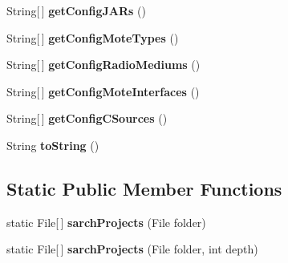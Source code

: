 \begin{DoxyCompactItemize}
\item 
\hypertarget{classorg_1_1contikios_1_1cooja_1_1COOJAProject_a94302bfa54c5c311ee8c6df2b28f17a2}{String\mbox{[}$\,$\mbox{]} {\bfseries get\-Config\-J\-A\-Rs} ()}\label{classorg_1_1contikios_1_1cooja_1_1COOJAProject_a94302bfa54c5c311ee8c6df2b28f17a2}

\item 
\hypertarget{classorg_1_1contikios_1_1cooja_1_1COOJAProject_aa8527b7be4d2b7480f3da0a647083188}{String\mbox{[}$\,$\mbox{]} {\bfseries get\-Config\-Mote\-Types} ()}\label{classorg_1_1contikios_1_1cooja_1_1COOJAProject_aa8527b7be4d2b7480f3da0a647083188}

\item 
\hypertarget{classorg_1_1contikios_1_1cooja_1_1COOJAProject_a6ba392a4710d172b48f57dad9754e19f}{String\mbox{[}$\,$\mbox{]} {\bfseries get\-Config\-Radio\-Mediums} ()}\label{classorg_1_1contikios_1_1cooja_1_1COOJAProject_a6ba392a4710d172b48f57dad9754e19f}

\item 
\hypertarget{classorg_1_1contikios_1_1cooja_1_1COOJAProject_a9956332e0a483415862f53c0945bb1e6}{String\mbox{[}$\,$\mbox{]} {\bfseries get\-Config\-Mote\-Interfaces} ()}\label{classorg_1_1contikios_1_1cooja_1_1COOJAProject_a9956332e0a483415862f53c0945bb1e6}

\item 
\hypertarget{classorg_1_1contikios_1_1cooja_1_1COOJAProject_a130fcaa4a1bb60b5c235ce3b4411bbc6}{String\mbox{[}$\,$\mbox{]} {\bfseries get\-Config\-C\-Sources} ()}\label{classorg_1_1contikios_1_1cooja_1_1COOJAProject_a130fcaa4a1bb60b5c235ce3b4411bbc6}

\item 
\hypertarget{classorg_1_1contikios_1_1cooja_1_1COOJAProject_ab0b22d3d3b81afd44d1970186a94ea4e}{String {\bfseries to\-String} ()}\label{classorg_1_1contikios_1_1cooja_1_1COOJAProject_ab0b22d3d3b81afd44d1970186a94ea4e}

\end{DoxyCompactItemize}
\subsection*{Static Public Member Functions}
\begin{DoxyCompactItemize}
\item 
\hypertarget{classorg_1_1contikios_1_1cooja_1_1COOJAProject_aea515f7bdb1982b665a5bc338319e240}{static File\mbox{[}$\,$\mbox{]} {\bfseries sarch\-Projects} (File folder)}\label{classorg_1_1contikios_1_1cooja_1_1COOJAProject_aea515f7bdb1982b665a5bc338319e240}

\item 
\hypertarget{classorg_1_1contikios_1_1cooja_1_1COOJAProject_aa8c58b6d1dd0cb7d1b554b102168e8f0}{static File\mbox{[}$\,$\mbox{]} {\bfseries sarch\-Projects} (File folder, int depth)}\label{classorg_1_1contikios_1_1cooja_1_1COOJAProject_aa8c58b6d1dd0cb7d1b554b102168e8f0}

\end{DoxyCompactItemize}
